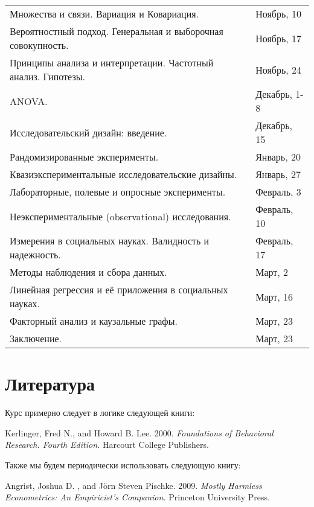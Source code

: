 \documentclass[12pt]{article}
\begin{document}
\begin{table}[H]
\begin{tabular}{p{}@{}p{}@{}}
Множества и связи.  Вариация и Ковариация.\dotfill & Ноябрь, 10 \\ 
Вероятностный подход. Генеральная и выборочная совокупность. \dotfill & Ноябрь, 17 \\
Принципы анализа и интерпретации.  Частотный анализ. Гипотезы.\dotfill & Ноябрь, 24 \\
ANOVA. \dotfill & Декабрь, 1-8 \\
Исследовательский дизайн: введение. \dotfill & Декабрь, 15 \\
Рандомизированные эксперименты. \dotfill & Январь, 20 \\
Квазиэкспериментальные исследовательские дизайны. \dotfill & Январь, 27 \\
Лабораторные,  полевые и опросные эксперименты. \dotfill & Февраль, 3 \\
Неэкспериментальные (observational) исследования. \dotfill & Февраль, 10 \\
Измерения в социальных науках. Валидность и надежность. \dotfill & Февраль, 17 \\
Методы наблюдения и сбора данных.  \dotfill & Март, 2 \\
Линейная регрессия и её приложения в социальных науках.  \dotfill & Март, 16 \\
Факторный анализ и каузальные графы.  \dotfill & Март,  23 \\
Заключение.  \dotfill & Март, 23 \\
\end{tabular}
\end{table}
\section*{Литература}
Курс примерно следует в логике следующей книги:

Kerlinger,  Fred N.,  and Howard B.  Lee.  2000.  \textit{Foundations of Behavioral Research. Fourth Edition.} Harcourt College Publishers. 

Также мы будем периодически использовать следующую книгу:

Angrist,  Joshua D. ,  and J\"orn  Steven Pischke.  2009.  \textit{Mostly Harmless Econometrics: An Empiricist's Companion.} Princeton University Press. 
\end{document}
